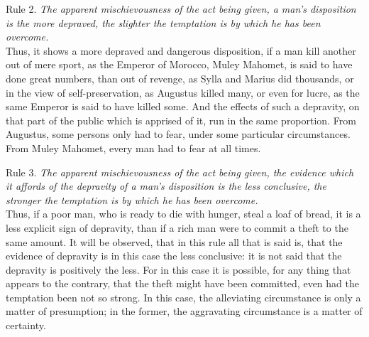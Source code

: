 \documentclass[12pt]{report}
\begin{document}
Rule 2. \emph{The apparent mischievousness of the act being given, a
man's disposition is the more depraved, the slighter the temptation is
by which he has been overcome.}\\
Thus, it shows a more depraved and dangerous disposition, if a man kill
another out of mere sport, as the Emperor of Morocco, Muley Mahomet, is
said to have done great numbers, than out of revenge, as Sylla and
Marius did thousands, or in the view of self-preservation, as Augustus
killed many, or even for lucre, as the same Emperor is said to have
killed some. And the effects of such a depravity, on that part of the
public which is apprised of it, run in the same proportion. From
Augustus, some persons only had to fear, under some particular
circumstances. From Muley Mahomet, every man had to fear at all times.

Rule 3. \emph{The apparent mischievousness of the act being given, the
evidence which it affords of the depravity of a man's disposition is the
less conclusive, the stronger the temptation is by which he has been
overcome.}\\
Thus, if a poor man, who is ready to die with hunger, steal a loaf of
bread, it is a less explicit sign of depravity, than if a rich man were
to commit a theft to the same amount. It will be observed, that in this
rule all that is said is, that the evidence of depravity is in this case
the less conclusive: it is not said that the depravity is positively the
less. For in this case it is possible, for any thing that appears to the
contrary, that the theft might have been committed, even had the
temptation been not so strong. In this case, the alleviating
circumstance is only a matter of presumption; in the former, the
aggravating circumstance is a matter of certainty.
\end{document}
